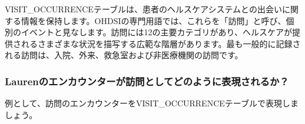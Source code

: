 \documentclass[
  11pt]{book}
\theoremstyle{definition}
\theoremstyle{definition}
\theoremstyle{definition}
\theoremstyle{definition}
\theoremstyle{remark}
\begin{document}
VISIT\_OCCURRENCEテーブルは、患者のヘルスケアシステムとの出会いに関する情報を保持します。OHDSIの専門用語では、これらを「訪問」と呼び、個別のイベントと見なします。訪問には12の主要カテゴリがあり、ヘルスケアが提供されるさまざまな状況を描写する広範な階層があります。最も一般的に記録される訪問は、入院、外来、救急室および非医療機関の訪問です。

\subsubsection*{Laurenのエンカウンターが訪問としてどのように表現されるか？}\label{laurenux306eux30a8ux30f3ux30abux30a6ux30f3ux30bfux30fcux304cux8a2aux554fux3068ux3057ux3066ux3069ux306eux3088ux3046ux306bux8868ux73feux3055ux308cux308bux304b}

例として、訪問のエンカウンターをVISIT\_OCCURRENCEテーブルで表現しましょう。
\end{document}

